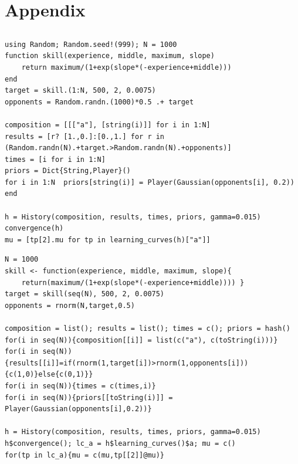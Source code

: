 \documentclass[a4paper,10pt]{book}
\theoremstyle{definition}
\newif\ifen
\newif\ifes
\newcommand{\en}[1]{\ifen#1\fi}
\newcommand{\es}[1]{\ifes#1\fi}
\begin{document}
\section{Appendix} \label{app:technical}

\subsection{\en{Skill evolution}}\label{sec:appendix_skill_evolution}

\en{We attach the \texttt{Julia} and \texttt{R} codes that solve the example presented in the section \ref{sec:skill_evolution} about estimation the skill evolution of a new player. }%
\es{Adjuntamos los códigos de \texttt{Julia} y \texttt{R} que resuelven el ejemplo presentado en la sección \ref{sec:skill_evolution} sobre la evolución de habilidad de un jugador nuevo. }%
%
\begin{lstlisting}[backgroundcolor=\color{julia!60},caption={\en{\texttt{Julia} code}\es{Código \texttt{Julia}}},aboveskip=0.0 \baselineskip, belowskip=0.1cm]
using Random; Random.seed!(999); N = 1000
function skill(experience, middle, maximum, slope)
    return maximum/(1+exp(slope*(-experience+middle))) 
end
target = skill.(1:N, 500, 2, 0.0075)
opponents = Random.randn.(1000)*0.5 .+ target

composition = [[["a"], [string(i)]] for i in 1:N]
results = [r? [1.,0.]:[0.,1.] for r in (Random.randn(N).+target.>Random.randn(N).+opponents)]
times = [i for i in 1:N]
priors = Dict{String,Player}()
for i in 1:N  priors[string(i)] = Player(Gaussian(opponents[i], 0.2))  end

h = History(composition, results, times, priors, gamma=0.015)
convergence(h)
mu = [tp[2].mu for tp in learning_curves(h)["a"]]
\end{lstlisting}
%
\begin{lstlisting}[backgroundcolor=\color{r!50},caption={\en{\texttt{R} code}\es{Código \texttt{R}}},aboveskip=0.0 \baselineskip, belowskip=0.1cm]
N = 1000
skill <- function(experience, middle, maximum, slope){
    return(maximum/(1+exp(slope*(-experience+middle)))) }
target = skill(seq(N), 500, 2, 0.0075)
opponents = rnorm(N,target,0.5)

composition = list(); results = list(); times = c(); priors = hash()
for(i in seq(N)){composition[[i]] = list(c("a"), c(toString(i)))}
for(i in seq(N)){results[[i]]=if(rnorm(1,target[i])>rnorm(1,opponents[i])){c(1,0)}else{c(0,1)}}
for(i in seq(N)){times = c(times,i)}
for(i in seq(N)){priors[[toString(i)]] = Player(Gaussian(opponents[i],0.2))}
    
h = History(composition, results, times, priors, gamma=0.015)
h$convergence(); lc_a = h$learning_curves()$a; mu = c()
for(tp in lc_a){mu = c(mu,tp[[2]]@mu)}
\end{lstlisting}
\end{document}
